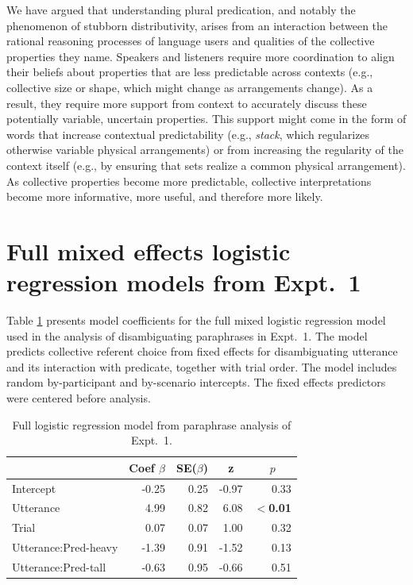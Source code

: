 \documentclass[linguex]{sp}
\begin{document}
We have argued that understanding plural predication, and notably the phenomenon of stubborn distributivity, arises from an interaction between the rational reasoning processes of language users and qualities of the collective properties they name. Speakers and listeners require more coordination to align their beliefs about properties that are less predictable across contexts (e.g., collective size or shape, which might change as arrangements change). As a result, they require more support from context to accurately discuss these potentially variable, uncertain properties. This support might come in the form of words that increase contextual predictability (e.g., \emph{stack}, which regularizes otherwise variable physical arrangements) or from increasing the regularity of the context itself (e.g., by ensuring that sets realize a common physical arrangement). As collective properties become more predictable, collective interpretations become more informative, more useful, and therefore more likely.


\appendix

\section{Full mixed effects logistic regression models from Expt.~1}\label{expt1results}


Table \ref{expt1analysis1} presents model coefficients for the full mixed logistic regression model used in the analysis of disambiguating paraphrases in Expt.~1. The model predicts collective referent choice from fixed effects for disambiguating utterance and its interaction with predicate, together with trial order. The model includes random by-participant and by-scenario intercepts. The fixed effects predictors were centered before analysis.

\begin{table}[htb] 
	\centering \caption{Full logistic regression model from paraphrase analysis of Expt.~1.} \label{expt1analysis1}
\begin{tabular}{lrrrr}\toprule
	&	Coef $\beta$	&	SE($\beta$)	&	\multicolumn{1}{c}{ \textbf{z}}	&	\multicolumn{1}{c}{$p$}\\ \midrule
Intercept	&	-0.25	&	0.25	&	-0.97	&	0.33\\
Utterance	&	4.99	&	0.82	&	6.08	&	\textbf{$<$0.01}\\
Trial	&	0.07	&	0.07	&	1.00	&	0.32\\
Utterance:Pred-heavy&	-1.39	&	0.91	&	-1.52	&	0.13\\
Utterance:Pred-tall&	-0.63	&	0.95	&	-0.66	&	0.51\\
\bottomrule
\end{tabular}
\end{table}
\end{document}
